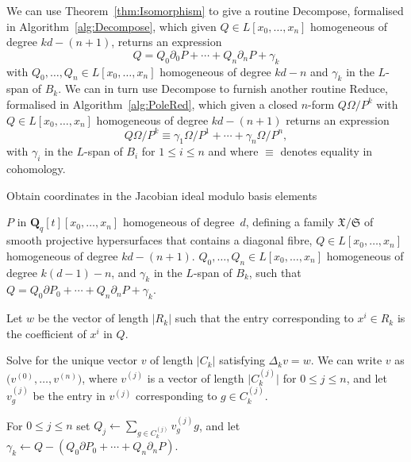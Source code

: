 \documentclass[a4paper,11pt]{article}
\numberwithin{equation}{section}
\providecommand{\abs}[1]{\lvert#1\rvert}                 %
\newcommand{\QQ}{\mathbf{Q}} %
\theoremstyle{definition}
\begin{document}
We can use Theorem~\ref{thm:Isomorphism} to give a routine {\sc Decompose}, 
formalised in Algorithm~\ref{alg:Decompose}, which given 
$Q \in L[x_0, \dotsc, x_n]$ homogeneous of degree $kd - (n+1)$, 
returns an expression 
\begin{equation*}
Q = Q_0 \partial_0 P + \dotsb + Q_n \partial_n P + \gamma_k
\end{equation*} 
with $Q_0, \dotsc, Q_n \in L[x_0, \dotsc, x_n]$ homogeneous of 
degree $kd-n$ and $\gamma_k$ in the $L$-span of $B_k$. We can in turn 
use {\sc Decompose} to furnish another routine {\sc Reduce}, formalised 
in Algorithm~\ref{alg:PoleRed}, which given a closed $n$-form $Q\Omega/P^k$ 
with $Q \in L[x_0, \dotsc, x_n]$ homogeneous of degree $kd - (n+1)$ returns 
an expression
\begin{equation*}
Q \Omega / P^k \equiv \gamma_{1} \Omega / P^{1} + \dotsb + \gamma_n \Omega / P^n,
\end{equation*}
with $\gamma_i$ in the $L$-span of $B_i$ for $1 \leq i \leq n$ and 
where $\equiv$ denotes equality in cohomology.


\begin{algorithm}
\caption{Obtain coordinates in the Jacobian ideal modulo basis elements}
\label{alg:Decompose}
\begin{algorithmic}
\Require $P$ in $\QQ_q[t][x_0, \dotsc, x_n]$ homogeneous of degree~$d$, 
         defining a family $\mathfrak{X}/\mathfrak{S}$ of smooth projective 
         hypersurfaces that contains a diagonal fibre, 
         $Q \in L[x_0, \dotsc, x_n]$ homogeneous of degree $kd - (n+1)$.
\Ensure  $Q_0, \dotsc, Q_n \in L[x_0, \dotsc, x_n]$ homogeneous of degree 
         $k(d-1)-n$, and $\gamma_k$ in the $L$-span of $B_k$, such that 
         $Q = Q_0 \partial P_0 + \dotsb + Q_n \partial_n P +\gamma_k$.
\State \begin{compactenum}[{\hspace{1em}} 1.] \vspace{-1.24em}
\item Let $w$ be the vector of length $\abs{R_k}$ such that the entry 
      corresponding to $x^i \in R_k$ is the coefficient of 
      $x^i$ in $Q$.
\item Solve for the unique vector $v$ of length $\abs{C_k}$ satisfying 
      $\Delta_k v = w$.  We can write $v$ 
      as $\bigl(v^{(0)}, \dotsc, v^{(n)}\bigr)$, where $v^{(j)}$ is 
      a vector of length $\abs{C_k^{(j)}}$ for $0 \leq j \leq n$,
      and let $v_g^{(j)}$ be the entry in $v^{(j)}$ corresponding 
      to $g \in C_k^{(j)}$.
\item For $0 \leq j \leq n$ set $Q_j \gets \sum_{g \in C_k^{(j)}} v_g^{(j)} g$, 
      and let $\gamma_k \gets Q-(Q_0 \partial P_0 + \dotsb + Q_n \partial_n P)$.
\EndProcedure
\end{compactenum}
\end{algorithmic}
\end{algorithm}
\end{document}
